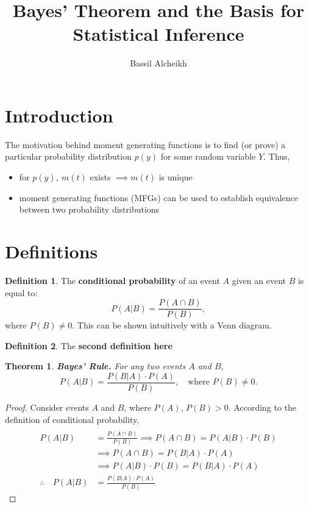 \documentclass[a4paper]{article}
\title{Bayes' Theorem and the Basis for Statistical Inference}
\author{Bassil Alcheikh}
\newtheorem{thm}{Theorem}
\theoremstyle{definition}
\newtheorem{defn}{Definition}[section]
\begin{document}
\maketitle

\section{Introduction}
The motivation behind moment generating functions is to find (or prove) a particular probability distribution $p(y)$ for some random variable $Y$. Thus,
\begin{itemize}
   \item  for $p(y), \: m(t)$ exists $\implies m(t)$ is unique
   \item  moment generating functions (MFGs) can be used to establish equivalence between two probability distributions
\end{itemize}
\section{Definitions}

\begin{defn} %
The \textbf{conditional probability} of an event $A$ given an event $B$ is equal to:
$$P(A|B) = \frac{P(A \cap B)}{P(B)},$$
where $P(B) \neq 0$. This can be shown intuitively with a Venn diagram.
\end{defn}
\bigbreak

\begin{defn} %
The \textbf{second definition here}
\end{defn}
\bigbreak
\begin{thm} \textbf{Bayes' Rule.} For any two events $A$ and $B$,
$$P(A|B) = \frac{P(B|A)\cdot P(A)}{P(B)}, \quad \text{where } P(B) \neq 0.$$
\end{thm}
\begin{proof} Consider events $A$ and $B$, where $P(A)$, $P(B) > 0$. According to the definition of conditional probability,
\begin{align*}
\\P(A|B) &= \frac{P(A \cap B)}{P(B)} \implies P(A\cap B) = P(A|B)\cdot P(B)
\\{}&\implies P(A\cap B) = P(B|A) \cdot P(A)
\\{}&\implies P(A|B)\cdot P(B) = P(B|A) \cdot P(A)
\\ \therefore \quad P(A|B) &= \frac{P(B|A)\cdot P(A)}{P(B)}
\end{align*}
\end{proof}
\end{document}

